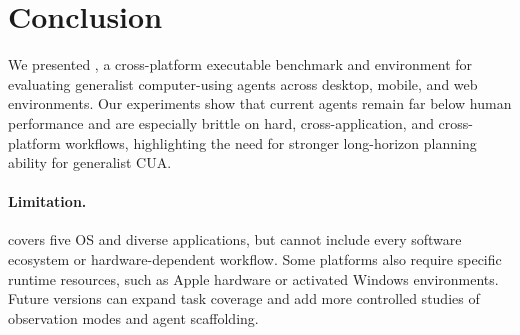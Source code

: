 \section{Conclusion}

We presented \dataset, a cross-platform executable benchmark and environment for evaluating generalist computer-using agents across desktop, mobile, and web environments. Our experiments show that current agents remain far below human performance and are especially brittle on hard, cross-application, and cross-platform workflows, highlighting the need for stronger long-horizon planning ability for generalist CUA.

\paragraph{Limitation.}
\dataset covers five OS and diverse applications, but cannot include every software ecosystem or hardware-dependent workflow. Some platforms also require specific runtime resources, such as Apple hardware or activated Windows environments. Future versions can expand task coverage and add more controlled studies of observation modes and agent scaffolding.
